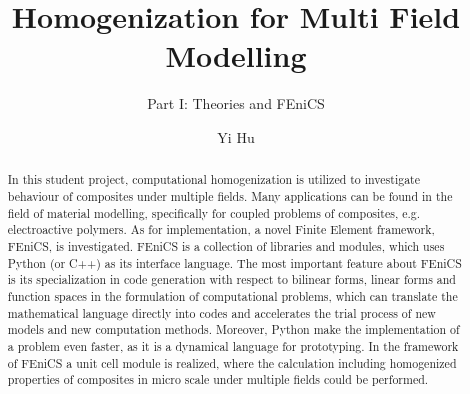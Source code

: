 \documentclass[10pt,a4paper]{scrartcl}
\author{Yi Hu}
\title{Homogenization for Multi Field Modelling}
\subtitle{Part I: Theories and FEniCS}
\begin{document}
\begin{abstract}
In this student project, computational homogenization is utilized to investigate behaviour of composites under multiple fields. Many applications can be found in the field of material modelling, specifically for coupled problems of composites, e.g. electroactive polymers. As for implementation, a novel Finite Element framework, FEniCS, is investigated. FEniCS is a collection of libraries and modules, which uses Python (or C++) as its interface language. The most important feature about FEniCS is its specialization in code generation with respect to bilinear forms, linear forms and function spaces in the formulation of computational problems, which can translate the mathematical language directly into codes and accelerates the trial process of new models and new computation methods. Moreover, Python make the implementation of a problem even faster, as it is a dynamical language for prototyping. In the framework of FEniCS a unit cell module is realized, where the calculation including homogenized properties of composites in micro scale under multiple fields could be performed.

\end{abstract}
\end{document}
